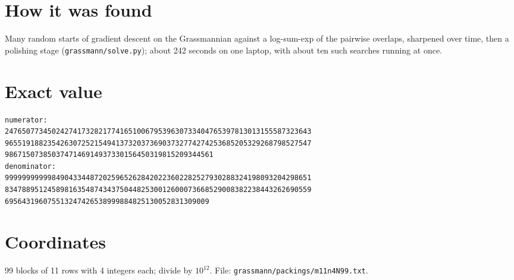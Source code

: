 \documentclass[11pt,a4paper]{article}
\begin{document}
\section{How it was found}
Many random starts of gradient descent on the Grassmannian against a log-sum-exp of the pairwise overlaps, sharpened over time, then a polishing stage (\texttt{grassmann/solve.py}); about 242 seconds on one laptop, with about ten such searches running at once.


\appendix
\section{Exact value}
{\small
\begin{verbatim}
numerator:
247650773450242741732821774165100679539630733404765397813013155587323643
965519188235426307252154941373203736903732774274253685205329268798527547
9867150738503747146914937330156450319815209344561
denominator:
999999999998490433448720259652628420223602282527930288324198093204298651
834788951245898163548743437504482530012600073668529008382238443262690559
695643196075513247426538999884825130052831309009
\end{verbatim}}

\section{Coordinates}
99 blocks of 11 rows with 4 integers each; divide by $10^{12}$. File: \texttt{grassmann/packings/m11n4N99.txt}.
{\tiny
\begin{multicols}{3}
\end{multicols}}
\end{document}
